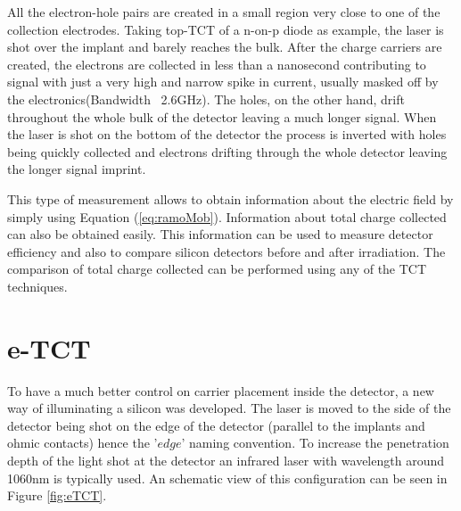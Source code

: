 All the electron-hole pairs are created in a small region very close to one of the collection electrodes. Taking top-TCT of a n-on-p diode as example, the laser is shot over the implant and barely reaches the bulk. After the charge carriers are created, the electrons are collected in less than a nanosecond contributing to signal with just a very high and narrow spike in current, usually masked off by the electronics(Bandwidth ~2.6GHz). The holes, on the other hand, drift throughout the whole bulk of the detector leaving a much longer signal. When the laser is shot on the bottom of the detector the process is inverted with holes being quickly collected and electrons drifting through the whole detector leaving the longer signal imprint.

This type of measurement allows to obtain information about the electric field by simply using Equation (\ref{eq:ramoMob}). Information about total charge collected can also be obtained easily. This information can be used to measure detector efficiency and also to compare silicon detectors before and after irradiation. The comparison of total charge collected can be performed using any of the TCT techniques.



\section{e-TCT} %


To have a much better control on carrier placement inside the detector, a new way of illuminating a silicon was developed. The laser is moved to the side of the detector being shot on the edge of the detector (parallel to the implants and ohmic contacts) hence the '$edge$' naming convention. To increase the penetration depth of the light shot at the detector an infrared laser with wavelength around 1060nm is typically used. An schematic view of this configuration can be seen in Figure \ref{fig:eTCT}.


